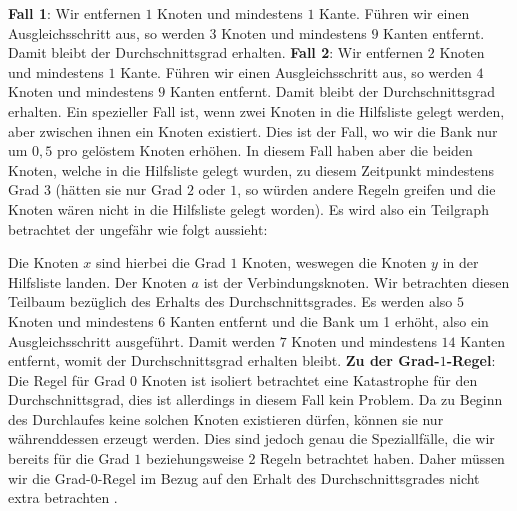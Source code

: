 \documentclass[12pt,onecolumn, notitlepage]{scrartcl}
\begin{document}
\textbf{Fall 1}: Wir entfernen $1$ Knoten und mindestens $1$ Kante. Führen wir einen Ausgleichsschritt aus, so werden $3$ Knoten und mindestens $9$ Kanten entfernt. Damit bleibt der Durchschnittsgrad erhalten.\newline \newline 
\textbf{Fall 2}: Wir entfernen $2$ Knoten und mindestens $1$ Kante. Führen wir einen Ausgleichsschritt aus, so werden $4$ Knoten und mindestens $9$ Kanten entfernt. Damit bleibt der Durchschnittsgrad erhalten.\newline \newline 
Ein spezieller Fall ist, wenn zwei Knoten in die Hilfsliste gelegt werden, aber zwischen ihnen ein Knoten existiert. Dies ist der Fall, wo wir die Bank nur um $0,5$ pro gelöstem Knoten erhöhen. In diesem Fall haben aber die beiden Knoten, welche in die Hilfsliste gelegt wurden, zu diesem Zeitpunkt mindestens Grad $3$ (hätten sie nur Grad $2$ oder $1$, so würden andere Regeln greifen und die Knoten wären nicht in die Hilfsliste gelegt worden). \newline
Es wird also ein Teilgraph betrachtet der ungefähr wie folgt aussieht:\newline 
\begin{center}
\end{center}
Die Knoten $x$ sind hierbei die Grad $1$ Knoten, weswegen die Knoten $y$ in der Hilfsliste landen. Der Knoten $a$ ist der Verbindungsknoten. Wir betrachten diesen Teilbaum bezüglich des Erhalts des Durchschnittsgrades. Es werden also $5$ Knoten und mindestens $6$ Kanten entfernt und die Bank um 1 erhöht, also ein Ausgleichsschritt ausgeführt. Damit werden $7$ Knoten und mindestens $14$ Kanten entfernt, womit der Durchschnittsgrad erhalten bleibt.\newline \newline 
\textbf{Zu der Grad-$1$-Regel}:\newline
Die Regel für Grad $0$ Knoten ist isoliert betrachtet eine Katastrophe für den Durchschnittsgrad, dies ist allerdings in diesem Fall kein Problem. Da zu Beginn des Durchlaufes keine solchen Knoten existieren dürfen, können sie nur währenddessen erzeugt werden. Dies sind jedoch genau die Speziallfälle, die wir bereits für die Grad $1$ beziehungsweise $2$ Regeln betrachtet haben. Daher müssen wir die Grad-$0$-Regel im Bezug auf den Erhalt des Durchschnittsgrades nicht extra betrachten .\newline
\end{document}
